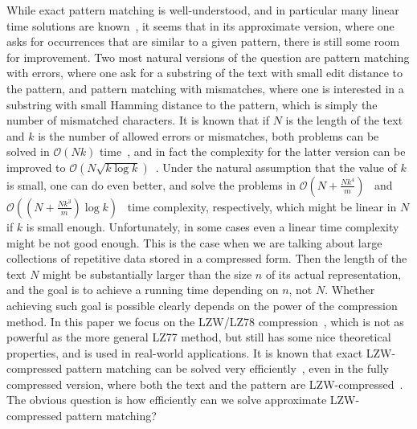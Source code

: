 \documentclass[runningheads]{llncs}
\begin{document}
While exact pattern matching is well-understood, and in particular many linear time solutions are known~\cite{Jewels}, it seems that in its approximate version, where one asks for occurrences that are similar to a given pattern, there is still some room for improvement. Two most natural versions of the question are pattern matching with errors, where one ask for a substring of the text with small edit distance to the pattern, and pattern matching with mismatches, where one is interested in a substring with small Hamming distance to the pattern, which is simply the number of mismatched characters. It is known that if $N$ is the length of the text and $k$ is the number of allowed errors or mismatches, both problems can be solved in $\mathcal{O}(Nk)$ time~\cite{LandauMismatches,Landau}, and in fact the complexity for the latter version can be improved to $\mathcal{O}(N\sqrt{k\log k})$~\cite{AmirMismatches}. Under the natural assumption that the value of $k$ is small, one can do even better, and solve the problems in $\mathcal{O}(N+\frac{Nk^{4}}{m})$~\cite{ColeHariharan} and $\mathcal{O}((N+\frac{Nk^{3}}{m})\log k)$~\cite{AmirMismatches} time complexity, respectively, which might be linear in $N$ if $k$ is small enough. Unfortunately, in some cases even a linear time complexity might be not good enough. This is the case when we are talking about large collections of repetitive data stored in
a compressed form. Then the length of the text $N$ might be substantially larger than the size $n$ of its actual representation, and the goal is to achieve a running time depending on $n$, not $N$. Whether achieving such goal is possible clearly depends on the power of the compression method. In this paper we focus on the LZW/LZ78 compression~\cite{LZW,LZ78}, which is not as powerful as the more general LZ77 method, but still has some nice theoretical properties, and is used in real-world applications. It is known that exact LZW-compressed pattern matching can be solved very efficiently~\cite{Amir,GawrychowskiLZW}, even in the fully compressed version, where both the text and the pattern are LZW-compressed~\cite{GawrychowskiFully}. The obvious question is how efficiently can we solve approximate LZW-compressed pattern matching?
\end{document}
